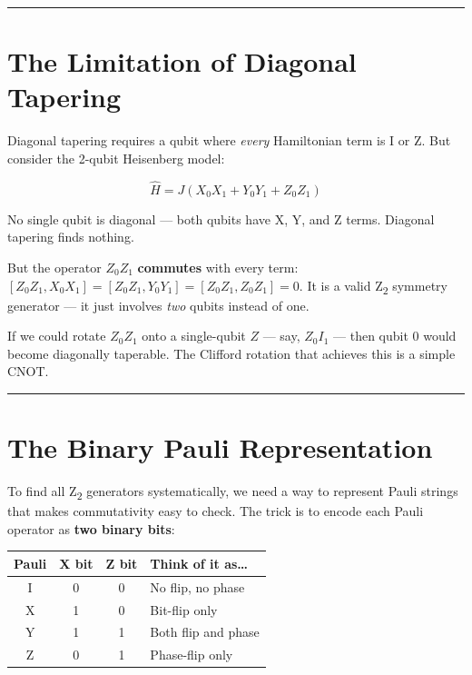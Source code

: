 \documentclass[
  11pt,
  oneside]{book}
\begin{document}
\begin{center}\rule{0.5\linewidth}{0.5pt}\end{center}

\section{The Limitation of Diagonal
Tapering}\label{the-limitation-of-diagonal-tapering}

Diagonal tapering requires a qubit where \emph{every} Hamiltonian term
is I or Z. But consider the 2-qubit Heisenberg model:

\[\hat{H} = J(X_0 X_1 + Y_0 Y_1 + Z_0 Z_1)\]

No single qubit is diagonal --- both qubits have X, Y, and Z terms.
Diagonal tapering finds nothing.

But the operator \(Z_0 Z_1\) \textbf{commutes} with every term:
\([Z_0 Z_1, X_0 X_1] = [Z_0 Z_1, Y_0 Y_1] = [Z_0 Z_1, Z_0 Z_1] = 0\). It
is a valid Z\textsubscript{2} symmetry generator --- it just involves \emph{two} qubits
instead of one.

If we could rotate \(Z_0 Z_1\) onto a single-qubit \(Z\) --- say,
\(Z_0 I_1\) --- then qubit 0 would become diagonally taperable. The
Clifford rotation that achieves this is a simple CNOT.

\begin{center}\rule{0.5\linewidth}{0.5pt}\end{center}

\section{The Binary Pauli
Representation}\label{the-binary-pauli-representation}

To find all Z\textsubscript{2} generators systematically, we need a way to represent
Pauli strings that makes commutativity easy to check. The trick is to
encode each Pauli operator as \textbf{two binary bits}:

\begin{longtable}[]{@{}cccl@{}}
\toprule\noalign{}
Pauli & X bit & Z bit & Think of it as\ldots{} \\
\midrule\noalign{}
\endhead
\bottomrule\noalign{}
\endlastfoot
I & 0 & 0 & No flip, no phase \\
X & 1 & 0 & Bit-flip only \\
Y & 1 & 1 & Both flip and phase \\
Z & 0 & 1 & Phase-flip only \\
\end{longtable}
\end{document}
